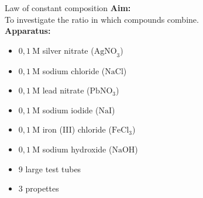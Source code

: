 \begin{Investigation}{Law of constant composition}
 \textbf{Aim:} \\
To investigate the ratio in which compounds combine. \\
\textbf{Apparatus:} \\
\begin{minipage}{.4\textwidth}
\begin{itemize}[noitemsep]
\item $0,1~\text{M}$ silver nitrate ($\text{AgNO}_3$)
\item $0,1~\text{M}$ sodium chloride ($\text{NaCl}$)
\item $0,1~\text{M}$ lead nitrate ($\text{PbNO}_{3}$)
\item $0,1~\text{M}$ sodium iodide ($\text{NaI}$)
\item $0,1~\text{M}$ iron (III) chloride ($\text{FeCl}_{3}$)
\item $0,1~\text{M}$ sodium hydroxide ($\text{NaOH}$)
\item 9 large test tubes
\item 3 propettes
\end{itemize}
\end{minipage} 
\begin{minipage}{.6\textwidth}
 \begin{center}
 \end{center}
\end{minipage}

\end{Investigation}
